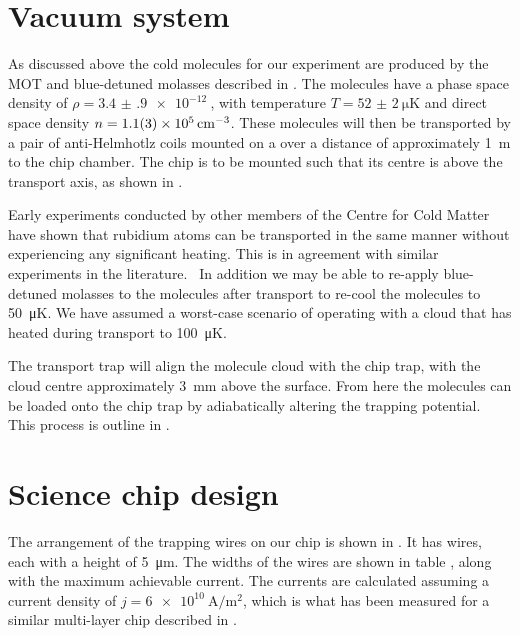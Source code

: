 \section{Vacuum system}


As discussed above  the cold \CaF{} molecules for our experiment
are produced by the MOT and blue-detuned molasses described in
. The molecules have a phase space density of
$\rho=\SI{3.4(9)e-12}{}$, with temperature $T=\SI{52(2)}{\micro\kelvin}$ and
direct space density $n=\SI{1.1(3)E5}{\per\centi\meter\cubed}$. These molecules
will then be transported by a pair of anti-Helmhotlz coils mounted on a
 over a distance of approximately \SI{1}{\meter} to the chip chamber.
The chip is to be mounted such that its centre is 
above the transport axis, as shown in .

Early experiments conducted by other members of the Centre for Cold Matter have
shown that rubidium atoms can be transported in the same manner without
experiencing any significant heating. This is in agreement with similar
experiments in the literature.~\cite{} In addition we may be able to re-apply
blue-detuned molasses to the molecules after transport to re-cool the molecules
to \SI{50}{\micro\kelvin}. We have assumed a worst-case scenario of operating
with a cloud that has heated during transport to \SI{100}{\micro\kelvin}.


The transport trap will align the molecule cloud with the chip trap, with the
cloud centre approximately \SI{3}{\milli\meter} above the surface. From here
the molecules can be loaded onto the chip trap by adiabatically altering the
trapping potential. This process is outline in . 

\section{Science chip design}

The arrangement of the trapping wires on our chip is shown in
. It has  wires, each with a height
of \SI{5}{\micro\meter}. The widths of the wires are shown in table
, along with the maximum achievable current. The
currents are calculated assuming a current density of
$j=\SI{6e10}{\ampere\per\meter\squared}$, which is what has been measured for a
similar multi-layer chip described in .

